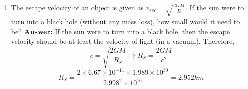 \documentclass[11pt]{scrartcl}
\begin{document}
{\begin{enumerate}[label=(\alph*)]
\newline \textbf{Answer: }
\newline Since there is no mass loss and assuming the sun and the neutron star as perfect symmetrical spheres,
\begin{equation}
    \frac{4\pi R^3_\odot \rho_\odot(r)}{3} = \frac{4\pi R^3_\star \rho_\star(r)}{3}
\end{equation}
\begin{equation}
    \rho_\star(r) = \frac{R^3_\odot \rho_\odot(r)}{R^3_\star} = \frac{696340^3 \times 1400}{8^3}= 9.233 \times 10^{17} kgm^{-3}
\end{equation}
\item The escape velocity of an object is given as $v_{esc} = \sqrt{\frac{2GM}{R}}$. If the sun were to turn into a black hole
(without any mass loss), how small would it need to be?
\newline \textbf{Answer: }
\newline If the sun were to turn into a black hole, then the escape velocity should be at least the velocity of light (in a vacuum). Therefore, 
\begin{equation}
    c = \sqrt{\frac{2GM}{R_S}} \rightarrow R_S = \frac{2GM}{c^2}
\end{equation}
\begin{equation}
    R_S = \frac{2 \times 6.67 \times 10^{-11} \times 1.989 \times 10^{30}}{2.998^2 \times 10^{16}} = 2.952km
\end{equation}
\end{enumerate}


}
\end{document}
